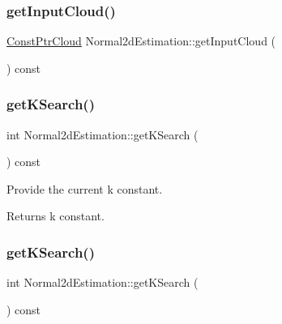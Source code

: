 \subsubsection{\texorpdfstring{get\+Input\+Cloud()}{getInputCloud()}\hspace{0.1cm}{\footnotesize\ttfamily [2/2]}}
{\footnotesize\ttfamily \hyperlink{Normal2dEstimation_8h_a389a43addc496dc19a5bb0575cc60bc4}{Const\+Ptr\+Cloud} Normal2d\+Estimation\+::get\+Input\+Cloud (\begin{DoxyParamCaption}{ }\end{DoxyParamCaption}) const\hspace{0.3cm}{\ttfamily [inline]}}

\mbox{\label{classNormal2dEstimation_a19ddcf3ade201742d36e64869c344641}} 
\subsubsection{\texorpdfstring{get\+K\+Search()}{getKSearch()}\hspace{0.1cm}{\footnotesize\ttfamily [1/2]}}
{\footnotesize\ttfamily int Normal2d\+Estimation\+::get\+K\+Search (\begin{DoxyParamCaption}{ }\end{DoxyParamCaption}) const\hspace{0.3cm}{\ttfamily [inline]}}



Provide the current k constant. 

\begin{DoxyReturn}{Returns}
k constant. 
\end{DoxyReturn}
\mbox{\label{classNormal2dEstimation_a19ddcf3ade201742d36e64869c344641}} 
\subsubsection{\texorpdfstring{get\+K\+Search()}{getKSearch()}\hspace{0.1cm}{\footnotesize\ttfamily [2/2]}}
{\footnotesize\ttfamily int Normal2d\+Estimation\+::get\+K\+Search (\begin{DoxyParamCaption}{ }\end{DoxyParamCaption}) const\hspace{0.3cm}{\ttfamily [inline]}}

